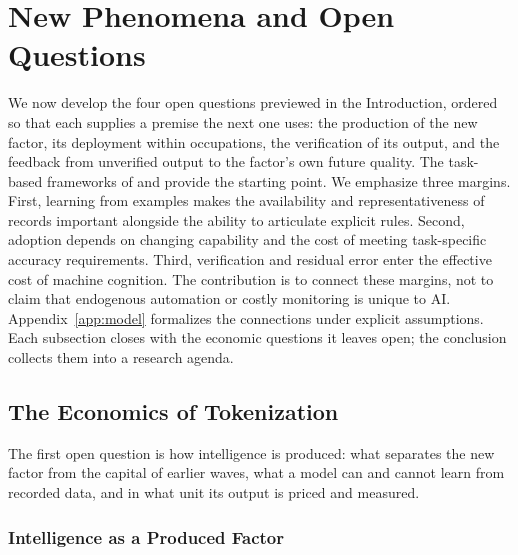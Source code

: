 \documentclass[12pt]{article}
\theoremstyle{plain}
\theoremstyle{definition}
\theoremstyle{remark}
\begin{document}
\section{New Phenomena and Open Questions}
\label{sec:open}

We now develop the four open questions previewed in the Introduction,
ordered so that each supplies a premise the next one uses: the
production of the new factor, its deployment within occupations, the
verification of its output, and the feedback from unverified output to
the factor's own future quality. The task-based frameworks of
\citet{AutorLevyMurnane2003} and \citet{AcemogluRestrepo2018Race}
provide the starting point. We emphasize three margins. First, learning
from examples makes the availability and representativeness of records
important alongside the ability to articulate explicit rules. Second,
adoption depends on changing capability and the cost of meeting
task-specific accuracy requirements. Third, verification and residual
error enter the effective cost of machine cognition. The contribution
is to connect these margins, not to claim that endogenous automation or
costly monitoring is unique to AI. Appendix~\ref{app:model} formalizes
the connections under explicit assumptions. Each subsection closes with
the economic questions it leaves open; the conclusion collects them into
a research agenda.

\subsection{The Economics of Tokenization}\label{subsec:tokenization}

The first open question is how intelligence is produced: what separates
the new factor from the capital of earlier waves, what a model can and
cannot learn from recorded data, and in what unit its output is priced
and measured.

\subsubsection{Intelligence as a Produced Factor}
\end{document}

